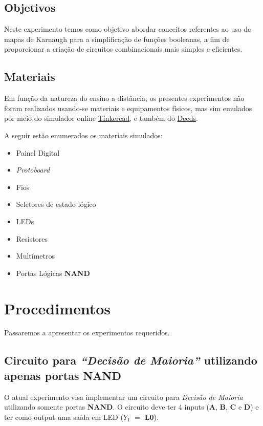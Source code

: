 \documentclass[12pt]{article}
\begin{document}
\subsection{Objetivos}
\label{sec:Objetivos}
Neste experimento temos como objetivo abordar conceitos referentes ao uso de
mapas de Karnaugh para a simplificação de funções booleanas, a fim de
proporcionar a criação de circuitos combinacionais mais simples e eficientes.

\subsection{Materiais}
\label{sec:Materiais}
Em função da natureza do ensino a distância, os presentes experimentos não foram
realizados usando-se materiais e equipamentos físicos, mas sim emulados por meio
do simulador online \href{https://www.tinkercad.com/}{Tinkercad}, e também do
\href{https://www.digitalelectronicsdeeds.com/deeds.html}{Deeds}.

A seguir estão enumerados os materiais simulados:
\begin{itemize}
    \item Painel Digital
    \item \textit{Protoboard}
    \item Fios
    \item Seletores de estado lógico
    \item LEDs
    \item Resistores
    \item Multímetros
    \item Portas Lógicas \textbf{NAND}
\end{itemize}

\section{Procedimentos}
\label{sec:Procedimentos}

Passaremos a apresentar os experimentos requeridos.

\subsection{Circuito para \textit{``Decisão de Maioria''} utilizando apenas portas \textbf{NAND}}\label{sec:decisao_maioria}

O atual experimento visa implementar um circuito para \textit{Decisão de
Maioria} utilizando somente portas \textbf{NAND}. O circuito deve ter 4 inputs
(\textbf{A}, \textbf{B}, \textbf{C} e \textbf{D}) e ter como output uma saída em
LED (\(Y_{1}\) \( = \) \textbf{L0}).
\end{document}
